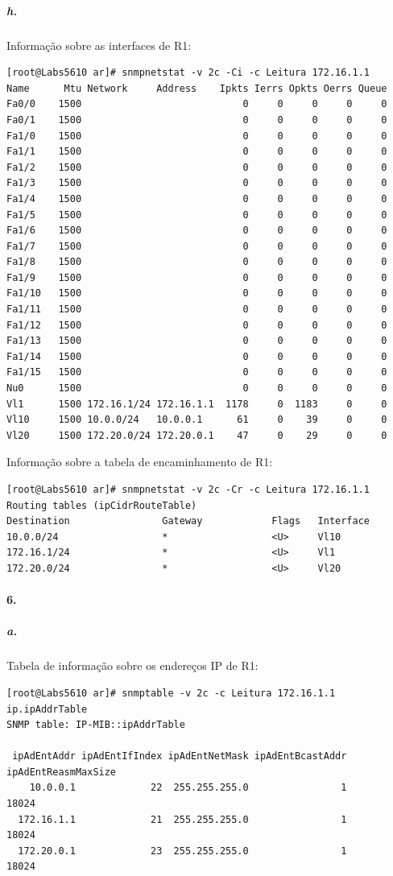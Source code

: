 \subparagraph{h.}
Informação sobre as interfaces de \textsf{R1}:
\begin{verbatim}
[root@Labs5610 ar]# snmpnetstat -v 2c -Ci -c Leitura 172.16.1.1
Name      Mtu Network     Address    Ipkts Ierrs Opkts Oerrs Queue
Fa0/0    1500                            0     0     0     0     0
Fa0/1    1500                            0     0     0     0     0
Fa1/0    1500                            0     0     0     0     0
Fa1/1    1500                            0     0     0     0     0
Fa1/2    1500                            0     0     0     0     0
Fa1/3    1500                            0     0     0     0     0
Fa1/4    1500                            0     0     0     0     0
Fa1/5    1500                            0     0     0     0     0
Fa1/6    1500                            0     0     0     0     0
Fa1/7    1500                            0     0     0     0     0
Fa1/8    1500                            0     0     0     0     0
Fa1/9    1500                            0     0     0     0     0
Fa1/10   1500                            0     0     0     0     0
Fa1/11   1500                            0     0     0     0     0
Fa1/12   1500                            0     0     0     0     0
Fa1/13   1500                            0     0     0     0     0
Fa1/14   1500                            0     0     0     0     0
Fa1/15   1500                            0     0     0     0     0
Nu0      1500                            0     0     0     0     0
Vl1      1500 172.16.1/24 172.16.1.1  1178     0  1183     0     0
Vl10     1500 10.0.0/24   10.0.0.1      61     0    39     0     0
Vl20     1500 172.20.0/24 172.20.0.1    47     0    29     0     0
\end{verbatim}

Informação sobre a tabela de encaminhamento de \textsf{R1}:
\begin{verbatim}
[root@Labs5610 ar]# snmpnetstat -v 2c -Cr -c Leitura 172.16.1.1
Routing tables (ipCidrRouteTable)
Destination                Gateway            Flags   Interface
10.0.0/24                  *                  <U>     Vl10
172.16.1/24                *                  <U>     Vl1
172.20.0/24                *                  <U>     Vl20
\end{verbatim}


\paragraph{6.}

\subparagraph{a.}
Tabela de informação sobre os endereços IP de \textsf{R1}:
\begin{verbatim}
[root@Labs5610 ar]# snmptable -v 2c -c Leitura 172.16.1.1 ip.ipAddrTable
SNMP table: IP-MIB::ipAddrTable

 ipAdEntAddr ipAdEntIfIndex ipAdEntNetMask ipAdEntBcastAddr ipAdEntReasmMaxSize
    10.0.0.1             22  255.255.255.0                1               18024
  172.16.1.1             21  255.255.255.0                1               18024
  172.20.0.1             23  255.255.255.0                1               18024

\end{verbatim}


